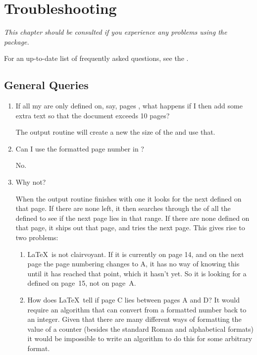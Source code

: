 \documentclass[fontsize=12pt]{scrbook}
\newcommand\chapdesc[1]{\par\emph{#1}\par}
\newcommand{\chapdesc}[1]{%
   \appenddynamiccontents*{chaphead}{\par \normalfont\emph{#1}}%
  }
\begin{document}
\chapter{Troubleshooting}

\chapdesc{This chapter should be consulted if you experience any
problems using the \glsfmttext{pkg.flowfram} package.}

For an up-to-date list of frequently asked questions, see
the .

\section{General Queries}\label{sec:generalqueries}

\begin{enumerate}
\item If all my  are only defined on, say, 
pages , what happens if I then add some extra text so that
the document exceeds 10 pages?

The output routine will create a new  the size 
of the  and use that.

\item Can I use the formatted page number in ?

No.

\item\label{itm:whynot} Why not?

When the output routine finishes with one  it looks for the
next  defined on that page. If there are none left, it then
searches through the  of all the defined  to
see if the next page lies in that range. If there are none defined on
that page, it ships out that page, and tries the next page.  This gives
rise to two problems:
\begin{enumerate}
\item \LaTeX\ is not clairvoyant. If it is currently
on page 14, and on the next page the page numbering changes
to A, it has no way of knowing this until it has reached
that point, which it hasn't yet. So it is looking for a 
 defined on page~15, not on page~A.

\item How does \LaTeX\ tell if page C lies between 
pages A and D\@? It would require an algorithm that can convert
from a formatted number back to an integer. Given that there
are many different ways of formatting the value of a counter
(besides the standard Roman and alphabetical formats) it
would be impossible to write an algorithm to do this
for some arbitrary format.


\end{enumerate}
\end{enumerate}
\end{document}
